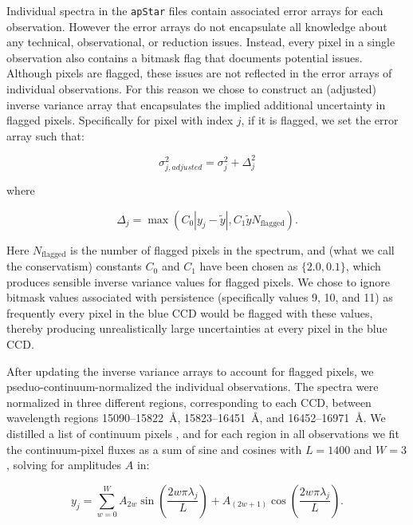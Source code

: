 \documentclass[12pt,preprint]{aastex}
\begin{document}
Individual spectra in the \texttt{apStar} files contain associated error arrays
for each observation.  However the error arrays do not encapsulate all knowledge
about any technical, observational, or reduction issues.  Instead, every pixel
in a single observation also contains a bitmask flag that documents potential
issues.  Although pixels are flagged, these issues are not reflected in the
error arrays of individual observations.  For this reason we chose to construct
an (adjusted) inverse variance array that encapsulates the implied additional 
uncertainty in flagged pixels.  Specifically for pixel with index $j$, if it is flagged, we set the error
array such that:



\begin{equation}
\sigma_{j,adjusted}^2 = \sigma_{j}^2 + \Delta_{j}^2
\end{equation}

\noindent{}where

\begin{equation}
\Delta_{j} = \max{\left(C_{0}|y_{j} - \widetilde{y}|,C_{1}\widetilde{y}N_\mathrm{flagged}\right)} .
\end{equation}

Here $N_\mathrm{flagged}$ is the number of flagged pixels in the spectrum, and (what
we call the conservatism) constants $C_0$ and $C_1$ have been chosen as 
$\{2.0,0.1\}$, which produces sensible inverse variance values for flagged
pixels.  We chose to ignore bitmask values associated with persistence 
(specifically values 9, 10, and 11) as frequently every pixel in the blue CCD
would be flagged with these values, thereby producing unrealistically large 
uncertainties at every pixel in the blue CCD.


After updating the inverse variance arrays to account for flagged pixels, we
pseduo-continuum-normalized the individual observations. The spectra were 
normalized in three different regions, corresponding to each CCD, between
wavelength regions 15090--15822~\AA, 15823--16451~\AA, and 16452--16971~\AA.
We distilled a list of continuum pixels \citep[following the initial 
identification in][]{tc}, and for each region in all observations we fit
the continuum-pixel fluxes as a sum of sine and cosines with $L = 1400$ and 
$W = 3$, solving for amplitudes $A$ in:

\begin{equation}
y_j = \sum_{w=0}^{W} A_{2w}\sin{\left(\frac{2w\pi\lambda_{j}}{L}\right)} + A_{(2w+1)}\cos{\left(\frac{2w\pi\lambda_{j}}{L}\right)}.
\end{equation}
\end{document}
